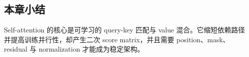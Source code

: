 \subsection{本章小结}

Self-attention 的核心是可学习的 query-key 匹配与 value 混合。它缩短依赖路径并提高训练并行性，却产生二次 score matrix，并且需要 position、mask、residual 与 normalization 才能成为稳定架构。

